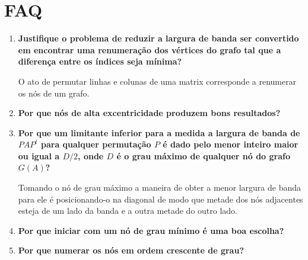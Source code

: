% 
% 
% 

\section{FAQ}
\begin{enumerate}
    \item \textbf{Justifique o problema de reduzir a largura de banda ser
        convertido em encontrar uma renumeração dos vértices do grafo tal que
        a diferença entre os índices seja mínima?}
        \cite{Fernanda:2005:ReordenacaoCCCG}

        O ato de permutar linhas e colunas de uma matrix corresponde a renumerar
        os nós de um grafo. \cite{Gibbs:1976:ReducingBandwidth}

    \item \textbf{Por que nós de alta excentricidade produzem bons
        resultados?} \cite{Fernanda:2005:ReordenacaoCCCG}

    \item \textbf{Por que um limitante inferior para a medida a largura de
        banda de $P A P^t$ para qualquer permutação $P$ é dado pelo menor
        inteiro maior ou igual a $D/2$, onde $D$ é o grau máximo de
        qualquer nó do grafo $G(A)$?} \cite{Cuthill:1969:ReducingBandwidth}

        Tomando o nó de grau máximo a maneira de obter a menor largura de
        banda para ele é posicionando-o na diagonal de modo que metade dos nós
        adjacentes esteja de um lado da banda e a outra metade do outro lado.

    \item \textbf{Por que iniciar com um nó de grau mínimo é uma boa escolha?}
        \cite{Cuthill:1969:ReducingBandwidth}

    \item \textbf{Por que numerar os nós em ordem crescente de grau?}
        \cite{Cuthill:1969:ReducingBandwidth}


\end{enumerate}

